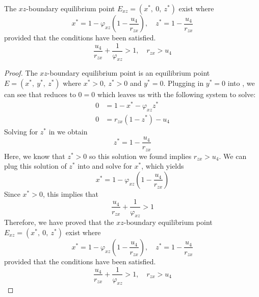 \begin{theorem}\label{thm:eq-boundary-xz-exist}
    The $xz$-boundary equilibrium point $E_{xz}=\left(x^*,\ 0,\ z^*\right)$ exist where
    \begin{equation*}
        x^*=1-\varphi_{xz}\left(1-\frac{u_4}{r_{zx}}\right),\quad
        z^*=1-\frac{u_4}{r_{zx}}
    \end{equation*}
    provided that the conditions have been satisfied.
    \begin{equation*}
        \frac{u_4}{r_{zx}}+\frac{1}{\varphi_{xz}} > 1,\quad 
        r_{zx}>u_4
    \end{equation*}
\end{theorem}
\begin{proof}
    The $xz$-boundary equilibrium point is an equilibrium point $E=\left(x^*,\ y^*,\ z^*\right)$ where $x^*>0,\ z^*>0$ and $y^*=0$. Plugging in $y^*=0$ into , we can see that  reduces to $0=0$ which leaves us with the following system to solve:
    \begin{subequations}\label{system:xz-boundary}
        \begin{align}
            0 &= 1-x^*-\varphi_{xz}z^* \label{eq:xz-boundary-x}\\
            0 &= r_{zx}\left(1-z^*\right)-u_4 \label{eq:xz-boundary-z}
        \end{align}
    \end{subequations}
    Solving for $z^*$ in  we obtain
    \begin{equation*}
        z^*=1-\frac{u_4}{r_{zx}}
    \end{equation*}
    Here, we know that $z^*>0$ so this solution we found implies $r_{zx}>u_4$. We can plug this solution of $z^*$ into  and solve for $x^*$, which yields 
    \begin{equation*}
        x^*=1-\varphi_{xz}\left(1-\frac{u_4}{r_{zx}}\right)
    \end{equation*}
    Since $x^*>0$, this implies that
    \begin{equation*}
        \frac{u_4}{r_{zx}}+\frac{1}{\varphi_{xz}} > 1
    \end{equation*}
    Therefore, we have proved that the $xz$-boundary equilibrium point $E_{xz}=\left(x^*,\ 0,\ z^*\right)$ exist where 
    \begin{equation*}
        x^*=1-\varphi_{xz}\left(1-\frac{u_4}{r_{zx}}\right),\quad z^*=1-\frac{u_4}{r_{zx}}
    \end{equation*}
    provided that the conditions have been satisfied.
    \begin{equation*}
        \frac{u_4}{r_{zx}}+\frac{1}{\varphi_{xz}} > 1,\quad 
        r_{zx}>u_4
    \end{equation*}
\end{proof}

